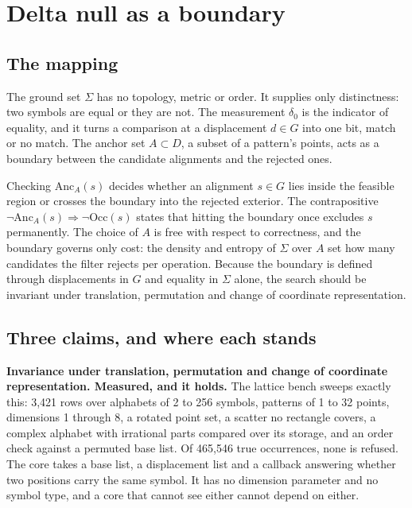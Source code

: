 \chapter{Delta null as a boundary}

\section{The mapping}

The ground set \(\Sigma\) has no topology, metric or order. It supplies only distinctness: two symbols
are equal or they are not. The measurement \(\delta_0\) is the indicator of equality, and it turns a
comparison at a displacement \(d \in G\) into one bit, match or no match. The anchor set
\(A \subset D\), a subset of a pattern's points, acts as a boundary between the candidate alignments
and the rejected ones.

Checking \(\mathrm{Anc}_A(s)\) decides whether an alignment \(s \in G\) lies inside the feasible region
or crosses the boundary into the rejected exterior. The contrapositive
\(\neg\mathrm{Anc}_A(s) \Rightarrow \neg\mathrm{Occ}(s)\) states that hitting the boundary once excludes
\(s\) permanently. The choice of \(A\) is free with respect to correctness, and the boundary governs
only cost: the density and entropy of \(\Sigma\) over \(A\) set how many candidates the filter rejects
per operation. Because the boundary is defined through displacements in \(G\) and equality in
\(\Sigma\) alone, the search should be invariant under translation, permutation and change of
coordinate representation.

\section{Three claims, and where each stands}

\textbf{Invariance under translation, permutation and change of coordinate representation. Measured,
and it holds.} The lattice bench sweeps exactly this: 3{,}421 rows over alphabets of 2 to 256 symbols,
patterns of 1 to 32 points, dimensions 1 through 8, a rotated point set, a scatter no rectangle covers,
a complex alphabet with irrational parts compared over its storage, and an order check against a
permuted base list. Of 465{,}546 true occurrences, none is refused. The core takes a base list, a
displacement list and a callback answering whether two positions carry the same symbol. It has no
dimension parameter and no symbol type, and a core that cannot see either cannot depend on either.

